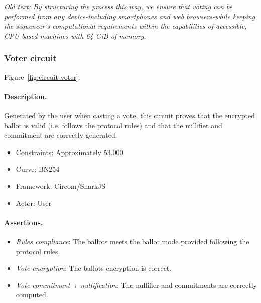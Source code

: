 \textit{Old text: By structuring the process this way, we ensure that voting can be performed from any device-including smartphones and web browsers-while keeping the sequencer's computational requirements within the capabilities of accessible, CPU-based machines with 64 GiB of memory.}




\subsubsection{Voter circuit}

Figure~\ref{fig:circuit-voter}.


\paragraph{Description.} Generated by the user when casting a vote, this circuit proves that the encrypted ballot is valid (i.e. follows the protocol rules) and that the nullifier and commitment are correctly generated.

\begin{itemize}
	\item Constraints: Approximately 53.000
	\item Curve: BN254
	\item Framework: Circom/SnarkJS
	\item Actor: User
\end{itemize}

\paragraph{Assertions.}

\begin{itemize}
	\item \emph{Rules compliance}: The ballots meets the ballot mode provided following the protocol rules.
	\item \emph{Vote encryption}: The ballots encryption is correct.
	\item \emph{Vote commitment + nullification}: The nullifier and commitments are correctly computed.
\end{itemize}

